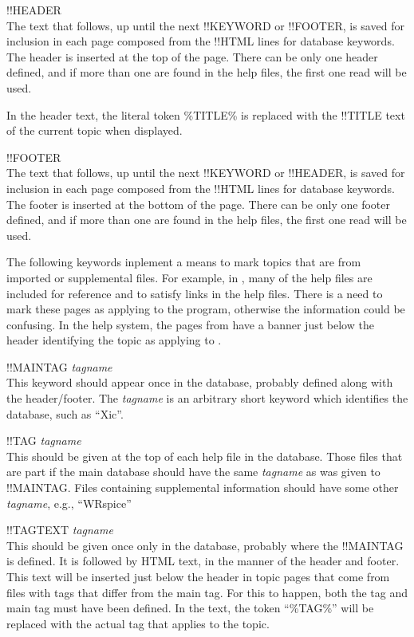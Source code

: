 \begin{description}
\item{\vt !!HEADER}\\
The text that follows, up until the next {\vt !!KEYWORD} or {\vt
!!FOOTER}, is saved for inclusion in each page composed from the {\vt
!!HTML} lines for database keywords.  The header is inserted at the
top of the page.  There can be only one header defined, and if more
than one are found in the help files, the first one read will be used.

In the header text, the literal token {\vt \%TITLE\%} is replaced with
the {\vt !!TITLE} text of the current topic when displayed.

\item{\vt !!FOOTER}\\
The text that follows, up until the next {\vt !!KEYWORD} or {\vt
!!HEADER}, is saved for inclusion in each page composed from the {\vt
!!HTML} lines for database keywords.  The footer is inserted at the
bottom of the page.  There can be only one footer defined, and if more
than one are found in the help files, the first one read will be used.
\end{description}

The following keywords inplement a means to mark topics that are from
imported or supplemental files.  For example, in {\Xic}, many of the
{\WRspice} help files are included for reference and to satisfy links
in the {\Xic} help files.  There is a need to mark these pages as
applying to the {\WRspice} program, otherwise the information could be
confusing.  In the {\Xic} help system, the pages from {\WRspice} have
a banner just below the header identifying the topic as applying to
{\WRspice}.

\begin{description}
\item{\vt !!MAINTAG} {\it tagname}\\
This keyword should appear once in the database, probably defined
along with the header/footer.  The {\it tagname} is an arbitrary short
keyword which identifies the database, such as ``{\vt Xic}''.

\item{\vt !!TAG} {\it tagname}\\
This should be given at the top of each help file in the database. 
Those files that are part if the main database should have the same
{\it tagname} as was given to {\vt !!MAINTAG}.  Files containing
supplemental information should have some other {\it tagname}, e.g.,
``{\vt WRspice}''

\item{\vt !!TAGTEXT} {\it tagname}\\
This should be given once only in the database, probably where the
{\vt !!MAINTAG} is defined.  It is followed by HTML text, in the
manner of the header and footer.  This text will be inserted just
below the header in topic pages that come from files with tags that
differ from the main tag.  For this to happen, both the tag and main
tag must have been defined.  In the text, the token ``{\vt \%TAG\%}''
will be replaced with the actual tag that applies to the topic.
\end{description}


